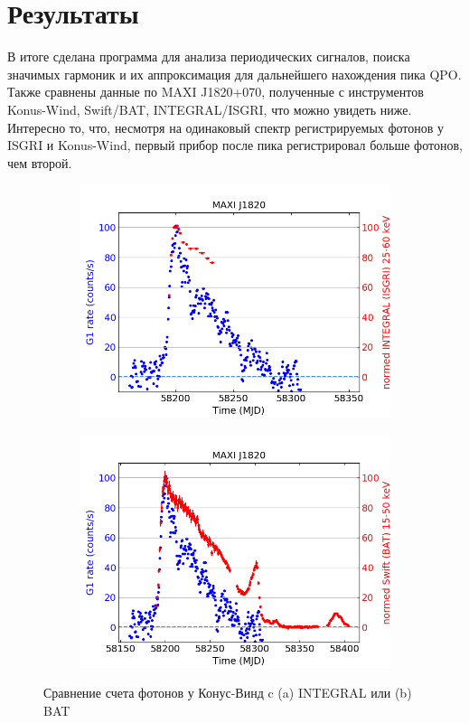 \section*{Результаты}
	

	В итоге сделана программа для анализа периодических сигналов, поиска значимых гармоник и их аппроксимация для дальнейшего нахождения пика QPO. Также сравнены данные по MAXI J1820+070, полученные с инструментов Konus-Wind, Swift/BAT, INTEGRAL/ISGRI, что можно увидеть ниже. Интересно то, что, несмотря на одинаковый спектр регистрируемых фотонов у ISGRI и Konus-Wind, первый прибор после пика регистрировал больше фотонов, чем второй.
	
	\begin{figure}[h!]
		\begin{subfigure}[b]{0.45\textwidth}
			\centering
			\includegraphics[width=\textwidth]{pictures/MAXIJ1820_kwG1_int.png}
			\caption{}
		\end{subfigure}
		\begin{subfigure}[b]{0.45\textwidth}
			\centering
			\includegraphics[width=\textwidth]{pictures/MAXIJ1820_kwG1_bat.png}
			\caption{}				
		\end{subfigure}
		\caption{Сравнение счета фотонов у Конус-Винд c (a) INTEGRAL или (b) BAT}
	\end{figure}
	
